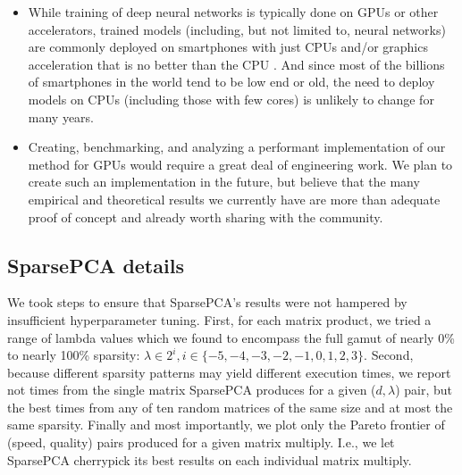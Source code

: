 \begin{itemize}
    \item While training of deep neural networks is typically done on GPUs or other accelerators, trained models (including, but not limited to, neural networks) are commonly deployed on smartphones with just CPUs and/or graphics acceleration that is no better than the CPU \cite{fbAtEdge}. And since most of the billions of smartphones in the world tend to be low end or old, the need to deploy models on CPUs (including those with few cores) is unlikely to change for many years.
    \item Creating, benchmarking, and analyzing a performant implementation of our method for GPUs would require a great deal of engineering work. We plan to create such an implementation in the future, but believe that the many empirical and theoretical results we currently have are more than adequate proof
    of concept and already worth sharing with the community. %
\end{itemize}



\subsection{SparsePCA details}

We took steps to ensure that SparsePCA's results were not hampered by insufficient hyperparameter tuning. First, for each matrix product, we tried a range of lambda values which we found to encompass the full gamut of nearly 0\% to nearly 100\% sparsity: $\lambda \in 2^i, i \in \{-5, -4, -3, -2, -1, 0, 1, 2, 3\}$. Second, because different sparsity patterns may yield different execution times, we report not times from the single matrix SparsePCA produces for a given ($d, \lambda$) pair, but the best times from any of ten random matrices of the same size and at most the same sparsity. Finally and most importantly, we plot only the Pareto frontier of (speed, quality) pairs produced for a given matrix multiply. I.e., we let SparsePCA cherrypick its best results on each individual matrix multiply.

